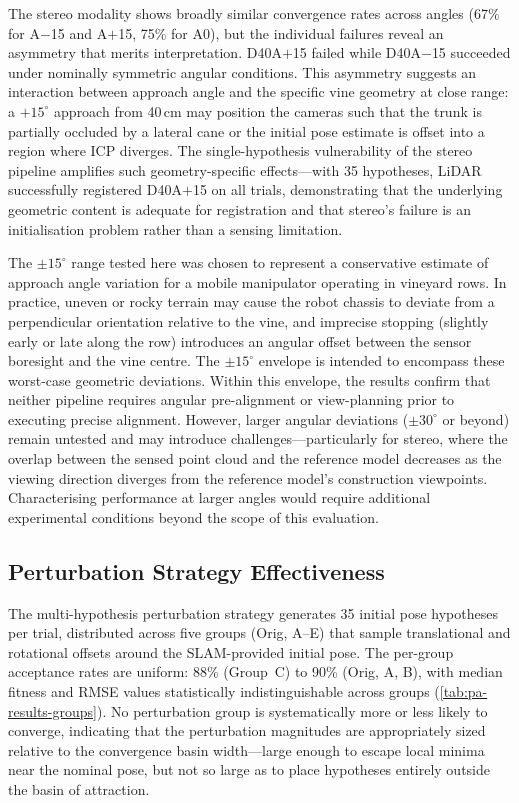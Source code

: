 The stereo modality shows broadly similar convergence rates across angles (67\% for A$-$15 and A$+$15, 75\% for A0), but the individual failures reveal an asymmetry that merits interpretation. D40A$+$15 failed while D40A$-$15 succeeded under nominally symmetric angular conditions. This asymmetry suggests an interaction between approach angle and the specific vine geometry at close range: a $+15^{\circ}$ approach from 40\,cm may position the cameras such that the trunk is partially occluded by a lateral cane or the initial pose estimate is offset into a region where ICP diverges. The single-hypothesis vulnerability of the stereo pipeline amplifies such geometry-specific effects---with 35 hypotheses, LiDAR successfully registered D40A$+$15 on all trials, demonstrating that the underlying geometric content is adequate for registration and that stereo's failure is an initialisation problem rather than a sensing limitation.

The $\pm 15^{\circ}$ range tested here was chosen to represent a conservative estimate of approach angle variation for a mobile manipulator operating in vineyard rows. In practice, uneven or rocky terrain may cause the robot chassis to deviate from a perpendicular orientation relative to the vine, and imprecise stopping (slightly early or late along the row) introduces an angular offset between the sensor boresight and the vine centre. The $\pm 15^{\circ}$ envelope is intended to encompass these worst-case geometric deviations. Within this envelope, the results confirm that neither pipeline requires angular pre-alignment or view-planning prior to executing precise alignment. However, larger angular deviations ($\pm 30^{\circ}$ or beyond) remain untested and may introduce challenges---particularly for stereo, where the overlap between the sensed point cloud and the reference model decreases as the viewing direction diverges from the reference model's construction viewpoints. Characterising performance at larger angles would require additional experimental conditions beyond the scope of this evaluation.

\subsection{Perturbation Strategy Effectiveness}
\label{subsec:pa-discussion-perturbation}

The multi-hypothesis perturbation strategy generates 35 initial pose hypotheses per trial, distributed across five groups (Orig, A--E) that sample translational and rotational offsets around the SLAM-provided initial pose. The per-group acceptance rates are uniform: 88\% (Group~C) to 90\% (Orig, A, B), with median fitness and RMSE values statistically indistinguishable across groups (\cref{tab:pa-results-groups}). No perturbation group is systematically more or less likely to converge, indicating that the perturbation magnitudes are appropriately sized relative to the convergence basin width---large enough to escape local minima near the nominal pose, but not so large as to place hypotheses entirely outside the basin of attraction.

